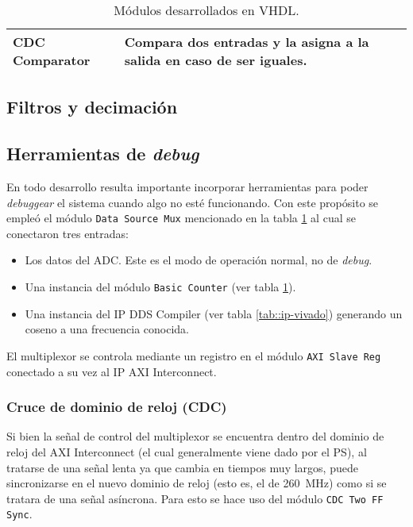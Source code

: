 \documentclass[../../main.tex]{subfiles}
\begin{document}
\begin{table}[H]
{\begin{tabular}{|ll|}
    \multicolumn{1}{|l|}{CDC Comparator}                                                    & Compara dos entradas y la asigna a la salida en caso de ser iguales.                                                                                                                                                                                                                                                     \\ \hline
    \end{tabular}%
    }
    \caption{Módulos desarrollados en VHDL.}
    \label{tab::ip-fran}
    \end{table}

\subsection{Filtros y decimación}


\subsection{Herramientas de \textit{debug}}
En todo desarrollo resulta importante incorporar herramientas para poder \textit{debuggear} el sistema cuando algo no esté funcionando. Con este propósito se empleó el módulo \texttt{Data Source Mux} mencionado en la tabla \ref{tab::ip-fran} al cual se conectaron tres entradas:
\begin{itemize}
    \item Los datos del ADC. Este es el modo de operación normal, no de \textit{debug}.
    \item Una instancia del módulo \texttt{Basic Counter} (ver tabla \ref{tab::ip-fran}).
    \item Una instancia del IP DDS Compiler (ver tabla \ref{tab::ip-vivado}) generando un coseno a una frecuencia conocida.
\end{itemize}

El multiplexor se controla mediante un registro en el módulo \texttt{AXI Slave Reg} conectado a su vez al IP AXI Interconnect.

\subsubsection{Cruce de dominio de reloj (CDC)}
Si bien la señal de control del multiplexor se encuentra dentro del dominio de reloj del AXI Interconnect (el cual generalmente viene dado por el PS), al tratarse de una señal lenta ya que cambia en tiempos muy largos, puede sincronizarse en el nuevo dominio de reloj (esto es, el de 260~MHz) como si se tratara de una señal asíncrona. Para esto se hace uso del módulo \texttt{CDC Two FF Sync}.
\end{document}
